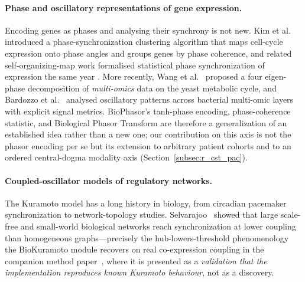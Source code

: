 \documentclass[preprint,12pt,amsmath,amssymb,superscriptaddress,floatfix]{revtex4-2}
\begin{document}
\paragraph{Phase and oscillatory representations of gene expression.}
Encoding genes as phases and analysing their synchrony is not new. Kim et al.~\citep{kim2008bmc}
introduced a phase-synchronization clustering algorithm that maps cell-cycle
expression onto phase angles and groups genes by phase coherence, and related
self-organizing-map work formalised statistical phase synchronization of
expression the same year \citep{kim2008somps}. More recently, Wang et al.~\citep{wang2025} proposed a four
eigen-phase decomposition of \emph{multi-omics} data on the yeast metabolic
cycle, and Bardozzo et al.~\citep{bardozzo2020} analysed oscillatory patterns across bacterial
multi-omic layers with explicit signal metrics. BioPhasor's tanh-phase encoding,
phase-coherence statistic, and Biological Phasor Transform are therefore a
generalization of an established idea rather than a new one; our contribution on
this axis is not the phasor encoding per se but its extension to arbitrary
patient cohorts and to an ordered central-dogma modality axis
(Section~\ref{subsec:r_cst_pac}).

\paragraph{Coupled-oscillator models of regulatory networks.}
The Kuramoto model has a long history in biology, from circadian pacemaker
synchronization to network-topology studies. Selvarajoo~\citep{selvarajoo2019} showed that
large scale-free and small-world biological networks reach synchronization at
lower coupling than homogeneous graphs---precisely the hub-lowers-threshold
phenomenology the BioKuramoto module recovers on real co-expression coupling
in the companion method paper~\cite{biophasor_platform}, where it is presented
as a \emph{validation that the implementation reproduces known Kuramoto
behaviour}, not as a discovery.
\end{document}
